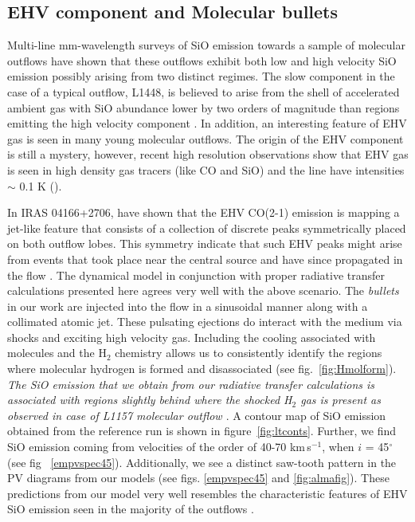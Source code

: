 \documentclass[useAMS,usenatbib]{mn2e}
\begin{document}
\subsection{EHV component and Molecular bullets}
\label{ssec:EHV}
Multi-line mm-wavelength surveys of SiO emission towards a sample of molecular
outflows have shown that these outflows exhibit both low and high
velocity SiO emission possibly arising from two distinct regimes. The slow
component in the case of a typical outflow, L1448, is believed to arise from
the shell of accelerated ambient gas with SiO abundance
lower by two orders of magnitude than regions emitting the high
velocity component
\cite{Codella:1999p12584}. In addition, an interesting feature of EHV
gas is seen in many young molecular outflows. The origin of the EHV
component is still a mystery, however, recent high resolution
observations show that EHV gas is seen in
high density gas tracers (like CO and SiO) and the line have
intensities $\sim$ 0.1 K (\citealt{Tafalla:2010p14759}).
%

In IRAS 04166+2706, \cite{SantiagoGarcia:2009p13972} have shown 
that the EHV CO(2-1) emission is mapping a jet-like
feature that consists of a collection of
discrete peaks symmetrically placed on both outflow lobes. This symmetry
indicate that such EHV peaks might arise from events that took place
near the central source and have since propagated in the flow
\citep{Bachiller:1990p11196, Tafalla:2011p14051}. The dynamical 
model in conjunction with proper radiative transfer calculations presented here 
agrees very well with the above scenario. The {\em{bullets}} in our
work are injected into the flow in a sinusoidal manner along with a
collimated atomic jet. These pulsating ejections do interact with the medium
via shocks and exciting high velocity gas. Including the cooling associated with
molecules and the H$_{2}$ chemistry allows us to
consistently identify the regions where molecular hydrogen is formed
and disassociated (see fig.~\ref{fig:Hmolform}). {\em The SiO emission that we
obtain from our radiative transfer calculations is associated with
regions slightly behind where the shocked H$_{2}$ gas is present
as observed in case of L1157 molecular outflow
\cite{Gueth:1998p14058}}. A contour map of SiO
emission obtained from the reference run is shown in
figure~\ref{fig:ltconts}. Further, we find SiO emission coming from velocities 
of the order of 40-70 km\,s$^{-1}$, when $i$ = 45$^{\circ}$ (see fig
~\ref{empvspec45}). Additionally, we see a distinct saw-tooth pattern
in the PV diagrams from our models (see figs. \ref{empvspec45} and
\ref{fig:almafig}). These predictions from our model very well
resembles the characteristic features of EHV SiO emission 
seen in the majority of the outflows \citep{SantiagoGarcia:2009p13972,
  Tafalla:2011p14051, Arce:2013p14902}.
%
\end{document}
